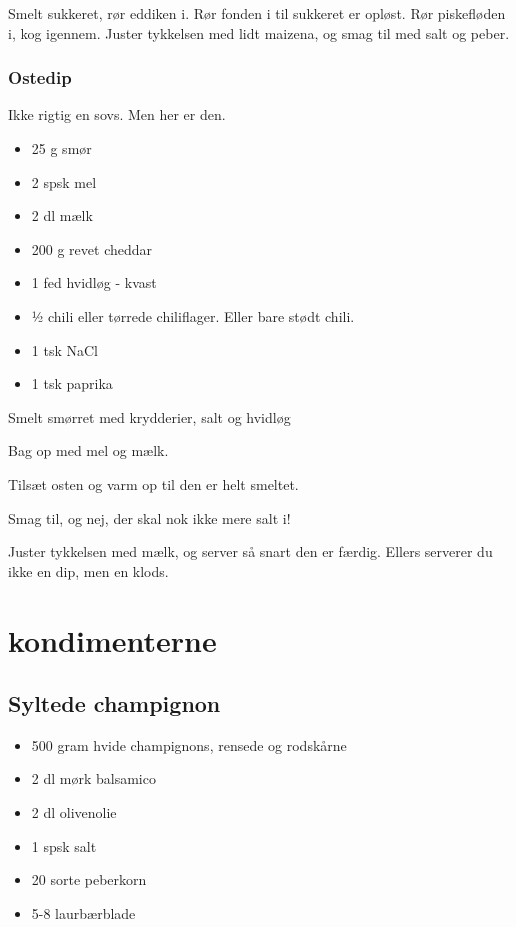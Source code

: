 \documentclass[
]{book}
\providecommand{\tightlist}{%
  \setlength{\itemsep}{0pt}\setlength{\parskip}{0pt}}
\begin{document}
Smelt sukkeret, rør eddiken i. Rør fonden i til sukkeret er opløst. Rør piskefløden i, kog igennem. Juster tykkelsen med lidt maizena, og smag til med salt og peber.

\hypertarget{ostedip}{%
\subsection{Ostedip}\label{ostedip}}

Ikke rigtig en sovs. Men her er den.

\begin{itemize}
\tightlist
\item
  25 g smør
\item
  2 spsk mel
\item
  2 dl mælk
\item
  200 g revet cheddar
\item
  1 fed hvidløg - kvast
\item
  ½ chili eller tørrede chiliflager. Eller bare stødt chili.
\item
  1 tsk NaCl
\item
  1 tsk paprika
\end{itemize}

Smelt smørret med krydderier, salt og hvidløg

Bag op med mel og mælk.

Tilsæt osten og varm op til den er helt smeltet.

Smag til, og nej, der skal nok ikke mere salt i!

Juster tykkelsen med mælk, og server så snart den er færdig. Ellers serverer du ikke en dip, men en klods.

\hypertarget{kondimenterne}{%
\chapter{kondimenterne}\label{kondimenterne}}

\hypertarget{syltede-champignon}{%
\section{Syltede champignon}\label{syltede-champignon}}

\begin{itemize}
\tightlist
\item
  500 gram hvide champignons, rensede og rodskårne
\item
  2 dl mørk balsamico
\item
  2 dl olivenolie
\item
  1 spsk salt
\item
  20 sorte peberkorn
\item
  5-8 laurbærblade
\end{itemize}
\end{document}
